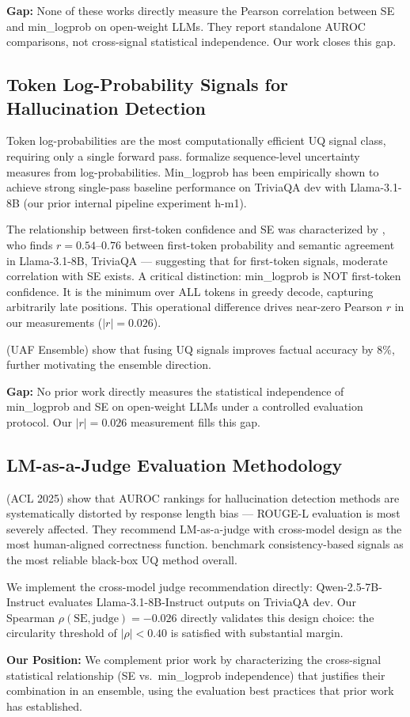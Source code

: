 \textbf{Gap:} None of these works directly measure the Pearson correlation between SE and min\_logprob on open-weight LLMs. They report standalone AUROC comparisons, not cross-signal statistical independence. Our work closes this gap.

\subsection{Token Log-Probability Signals for Hallucination Detection}

Token log-probabilities are the most computationally efficient UQ signal class, requiring only a single forward pass. \citet{malinin2021uncertainty} formalize sequence-level uncertainty measures from log-probabilities. Min\_logprob has been empirically shown to achieve strong single-pass baseline performance on TriviaQA dev with Llama-3.1-8B (our prior internal pipeline experiment h-m1).

The relationship between first-token confidence and SE was characterized by \citet{gabriel2026first}, who finds $r = 0.54$--$0.76$ between first-token probability and semantic agreement in Llama-3.1-8B, TriviaQA --- suggesting that for first-token signals, moderate correlation with SE exists. A critical distinction: min\_logprob is NOT first-token confidence. It is the minimum over ALL tokens in greedy decode, capturing arbitrarily late positions. This operational difference drives near-zero Pearson $r$ in our measurements ($|r| = 0.026$).

\citet{dey2025uncertainty} (UAF Ensemble) show that fusing UQ signals improves factual accuracy by 8\%, further motivating the ensemble direction.

\textbf{Gap:} No prior work directly measures the statistical independence of min\_logprob and SE on open-weight LLMs under a controlled evaluation protocol. Our $|r|=0.026$ measurement fills this gap.

\subsection{LM-as-a-Judge Evaluation Methodology}

\citet{santilli2025revisiting} (ACL 2025) show that AUROC rankings for hallucination detection methods are systematically distorted by response length bias --- ROUGE-L evaluation is most severely affected. They recommend LM-as-a-judge with cross-model design as the most human-aligned correctness function. \citet{xiong2023llms} benchmark consistency-based signals as the most reliable black-box UQ method overall.

We implement the cross-model judge recommendation directly: Qwen-2.5-7B-Instruct evaluates Llama-3.1-8B-Instruct outputs on TriviaQA dev. Our Spearman $\rho(\text{SE}, \text{judge}) = -0.026$ directly validates this design choice: the circularity threshold of $|\rho| < 0.40$ is satisfied with substantial margin.

\textbf{Our Position:} We complement prior work by characterizing the cross-signal statistical relationship (SE vs.\ min\_logprob independence) that justifies their combination in an ensemble, using the evaluation best practices that prior work has established.
